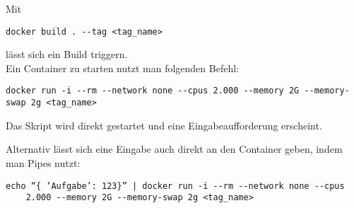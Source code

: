 Mit 
\begin{verbatim}docker build . --tag <tag_name>\end{verbatim}
lässt sich ein Build triggern. 
\\
Ein Container zu starten nutzt man folgenden Befehl:
\begin{verbatim}docker run -i --rm --network none --cpus 2.000 --memory 2G --memory-swap 2g <tag_name>\end{verbatim}

Das Skript wird direkt gestartet und eine Eingabeaufforderung erscheint. 

Alternativ lässt sich eine Eingabe auch direkt an den Container geben, indem man Pipes nutzt:
\begin{verbatim}echo “{ ‘Aufgabe’: 123}” | docker run -i --rm --network none --cpus 
	2.000 --memory 2G --memory-swap 2g <tag_name>\end{verbatim}





